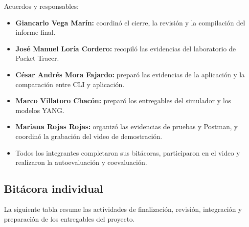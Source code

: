 Acuerdos y responsables:
\begin{itemize}
    \item \textbf{Giancarlo Vega Marín:} coordinó el cierre, la revisión y la
    compilación del informe final.
    \item \textbf{José Manuel Loría Cordero:} recopiló las evidencias del
    laboratorio de Packet Tracer.
    \item \textbf{César Andrés Mora Fajardo:} preparó las evidencias de la
    aplicación y la comparación entre CLI y aplicación.
    \item \textbf{Marco Villatoro Chacón:} preparó los entregables del
    simulador y los modelos YANG.
    \item \textbf{Mariana Rojas Rojas:} organizó las evidencias de pruebas y
    Postman, y coordinó la grabación del video de demostración.
    \item Todos los integrantes completaron sus bitácoras, participaron en el
    video y realizaron la autoevaluación y coevaluación.
\end{itemize}

\vspace{0.4cm}

\subsection{Bitácora individual}

La siguiente tabla resume las actividades de finalización, revisión,
integración y preparación de los entregables del proyecto.

